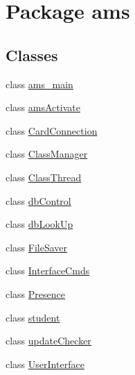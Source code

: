\hypertarget{namespaceams}{}\section{Package ams}
\label{namespaceams}
\subsection*{Classes}
\begin{DoxyCompactItemize}
\item 
class \mbox{\hyperlink{classams_1_1ams__main}{ams\+\_\+main}}
\item 
class \mbox{\hyperlink{classams_1_1ams_activate}{ams\+Activate}}
\item 
class \mbox{\hyperlink{classams_1_1_card_connection}{Card\+Connection}}
\item 
class \mbox{\hyperlink{classams_1_1_class_manager}{Class\+Manager}}
\item 
class \mbox{\hyperlink{classams_1_1_class_thread}{Class\+Thread}}
\item 
class \mbox{\hyperlink{classams_1_1db_control}{db\+Control}}
\item 
class \mbox{\hyperlink{classams_1_1db_look_up}{db\+Look\+Up}}
\item 
class \mbox{\hyperlink{classams_1_1_file_saver}{File\+Saver}}
\item 
class \mbox{\hyperlink{classams_1_1_interface_cmds}{Interface\+Cmds}}
\item 
class \mbox{\hyperlink{classams_1_1_presence}{Presence}}
\item 
class \mbox{\hyperlink{classams_1_1student}{student}}
\item 
class \mbox{\hyperlink{classams_1_1update_checker}{update\+Checker}}
\item 
class \mbox{\hyperlink{classams_1_1_user_interface}{User\+Interface}}
\end{DoxyCompactItemize}
